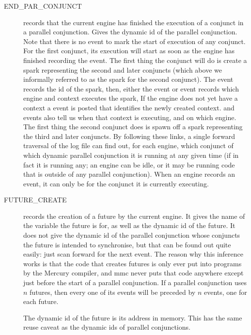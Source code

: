 \begin{description}
\item[END\_PAR\_CONJUNCT]
records that the current engine
has finished the execution of a conjunct in a parallel conjunction.
Gives the dynamic id of the parallel conjunction.
Note that there is no  event
to mark the start of execution of any conjunct.
For the first conjunct, its execution will start
as soon as the engine has finished recording the
 event.
The first thing the conjunct will do is create a spark
representing the second and later conjuncts
(which above we informally referred to as the spark for the second conjunct).
The  event records the id of the spark,
then, either the  event or  event records
which engine and context executes the spark,
If the engine does not yet have a context a 
event is posted that identifies the newly created context.
 and  events
also tell us when that context is executing, and on which engine.
The first thing the second conjunct does is spawn off a spark
representing the third and later conjuncts.
By following these links,
a single forward traversal of the log file can find out,
for each engine, which conjunct of which dynamic parallel conjunction
it is running at any given time
(if in fact it is running any;
an engine can be idle,
or it may be running code that is outside of any parallel conjunction).
When an engine records an  event,
it can only be for the conjunct it is currently executing.

\item[FUTURE\_CREATE] records the creation of a future by the current
engine.
It gives the name of the variable the future is for,
as well as the dynamic id of the future.
It does not give the dynamic id of the parallel conjunction
whose conjuncts the future is intended to synchronise,
but that can be found out quite easily:
just scan forward for the next 
event.
The reason why this inference works is that
the code that creates futures
is only ever put into programs by the Mercury compiler,
and mmc never puts that code anywhere
except just before the start of a parallel conjunction.
If a parallel conjunction uses $n$ futures,
then every one of its  events
will be preceded by $n$  events,
one for each future.

The dynamic id of the future is its address in memory.
This has the same reuse caveat
as the dynamic ids of parallel conjunctions.


\end{description}
